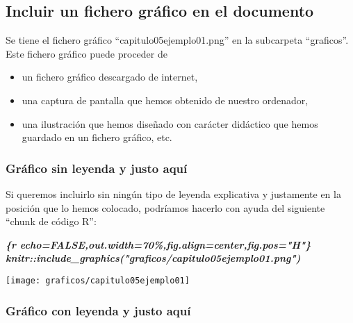 \documentclass[12pt,a4paper,]{book}
\newenvironment{Shaded}{\begin{snugshade}}{\end{snugshade}}
\newcommand{\InformationTok}[1]{\textcolor[rgb]{0.56,0.35,0.01}{\textbf{\textit{#1}}}}
\providecommand{\tightlist}{%
  \setlength{\itemsep}{0pt}\setlength{\parskip}{0pt}}
\numberwithin{dummy}{section}
\theoremstyle{ocrenumbox}
\theoremstyle{blacknumex}
\theoremstyle{blacknumbox}
\theoremstyle{ocrenum}
\theoremstyle{ocrenum}
\begin{document}
\hypertarget{incluir-un-fichero-gruxe1fico-en-el-documento}{%
\subsection{Incluir un fichero gráfico en el
documento}\label{incluir-un-fichero-gruxe1fico-en-el-documento}}

Se tiene el fichero gráfico ``capitulo05ejemplo01.png'' en la subcarpeta
``graficos''. Este fichero gráfico puede proceder de

\begin{itemize}
\tightlist
\item
  un fichero gráfico descargado de internet,
\item
  una captura de pantalla que hemos obtenido de nuestro ordenador,
\item
  una ilustración que hemos diseñado con carácter didáctico que hemos
  guardado en un fichero gráfico, etc.
\end{itemize}

\clearpage

\hypertarget{gruxe1fico-sin-leyenda-y-justo-aquuxed}{%
\subsubsection{Gráfico sin leyenda y justo
aquí}\label{gruxe1fico-sin-leyenda-y-justo-aquuxed}}

Si queremos incluirlo sin ningún tipo de leyenda explicativa y
justamente en la posición que lo hemos colocado, podríamos hacerlo con
ayuda del siguiente ``chunk de código R'':

\begin{Shaded}
\begin{Highlighting}[]
\InformationTok{\textasciigrave{}\textasciigrave{}\textasciigrave{}\{r echo=FALSE,out.width=\textquotesingle{}70\%\textquotesingle{},fig.align=\textquotesingle{}center\textquotesingle{},fig.pos="H"\}}
\InformationTok{knitr::include\_graphics("graficos/capitulo05ejemplo01.png")}
\InformationTok{\textasciigrave{}\textasciigrave{}\textasciigrave{}}
\end{Highlighting}
\end{Shaded}

\begin{center}\texttt{[image: graficos/capitulo05ejemplo01]} \end{center}

\hypertarget{gruxe1fico-con-leyenda-y-justo-aquuxed}{%
\subsubsection{Gráfico con leyenda y justo
aquí}\label{gruxe1fico-con-leyenda-y-justo-aquuxed}}
\end{document}
